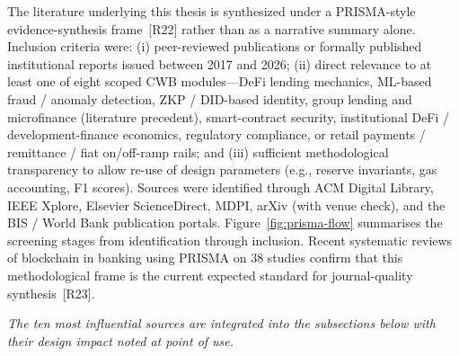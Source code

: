 \documentclass[12pt,a4paper]{report}
\begin{document}
The literature underlying this thesis is synthesized under a PRISMA-style evidence-synthesis frame~[R22] rather than as a narrative summary alone. Inclusion criteria were: (i) peer-reviewed publications or formally published institutional reports issued between 2017 and 2026; (ii) direct relevance to at least one of eight scoped CWB modules---DeFi lending mechanics, ML-based fraud / anomaly detection, ZKP / DID-based identity, group lending and microfinance (literature precedent), smart-contract security, institutional DeFi / development-finance economics, regulatory compliance, or retail payments / remittance / fiat on/off-ramp rails; and (iii) sufficient methodological transparency to allow re-use of design parameters (e.g., reserve invariants, gas accounting, F1 scores). Sources were identified through ACM Digital Library, IEEE Xplore, Elsevier ScienceDirect, MDPI, arXiv (with venue check), and the BIS / World Bank publication portals. Figure~\ref{fig:prisma-flow} summarises the screening stages from identification through inclusion. Recent systematic reviews of blockchain in banking using PRISMA on 38 studies confirm that this methodological frame is the current expected standard for journal-quality synthesis~[R23].

\noindent\textit{The ten most influential sources are integrated into the subsections below with their design impact noted at point of use.}
\end{document}
